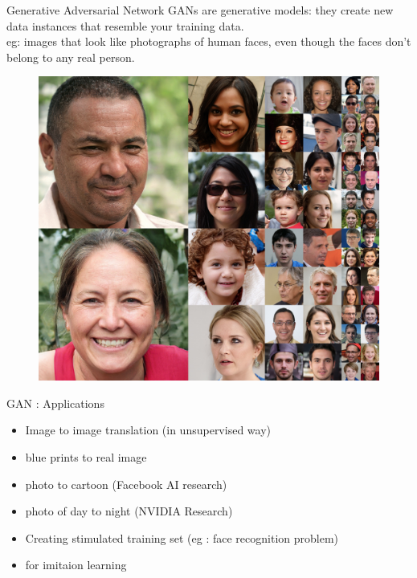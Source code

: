 \documentclass[10pt]{beamer}
\begin{document}



\begin{frame}[fragile]{Generative Adversarial Network}
 GANs are generative models: they create new data instances that resemble your training data. \\
 eg: images that look like photographs of human faces, even though the faces don't belong to any real person.
     \begin{figure}[ht]
      \hspace*{-1cm}\includegraphics[width=0.5\linewidth]{ganhumans} 

    \end{figure}
\end{frame}

\begin{frame}[fragile]{GAN : Applications}

    \begin{itemize}
        \item Image to image translation (in unsupervised way)
        \item blue prints to real image
        \item photo to cartoon (Facebook AI research)
        \item photo of day to night (NVIDIA Research)
        \item Creating stimulated training set (eg : face recognition problem)
        \item for imitaion learning
    \end{itemize}
\end{frame}
\end{document}
